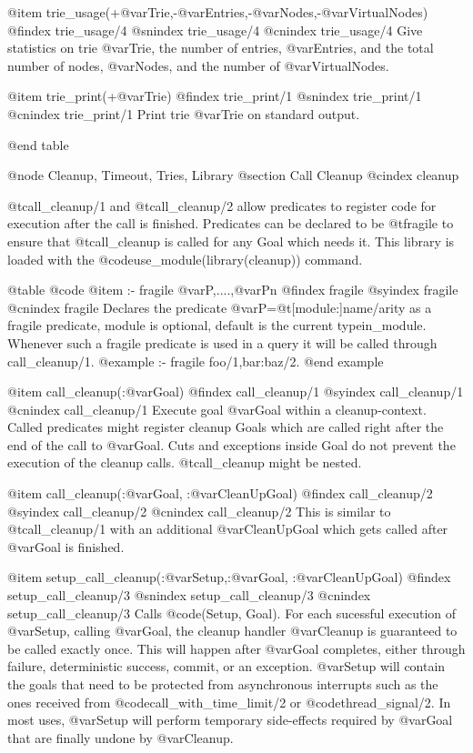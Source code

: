 {{{{{{{{{@item trie_usage(+@var{Trie},-@var{Entries},-@var{Nodes},-@var{VirtualNodes})
@findex trie_usage/4
@snindex trie_usage/4
@cnindex trie_usage/4
Give statistics on trie @var{Trie}, the number of entries,
@var{Entries}, and the total number of nodes, @var{Nodes}, and the
number of @var{VirtualNodes}.

@item trie_print(+@var{Trie})
@findex trie_print/1
@snindex trie_print/1
@cnindex trie_print/1
Print trie @var{Trie} on standard output.




@end table


@node Cleanup, Timeout, Tries, Library
@section Call Cleanup
@cindex cleanup

@t{call_cleanup/1} and @t{call_cleanup/2} allow predicates to register
code for execution after the call is finished. Predicates can be
declared to be @t{fragile} to ensure that @t{call_cleanup} is called
for any Goal which needs it. This library is loaded with the
@code{use_module(library(cleanup))} command.

@table @code
@item :- fragile @var{P},....,@var{Pn}
@findex fragile
@syindex fragile
@cnindex fragile
Declares the predicate @var{P}=@t{[module:]name/arity} as a fragile
predicate, module is optional, default is the current
typein_module. Whenever such a fragile predicate is used in a query
it will be called through call_cleanup/1.
@example
:- fragile foo/1,bar:baz/2.
@end example

@item call_cleanup(:@var{Goal})
@findex call_cleanup/1
@syindex call_cleanup/1
@cnindex call_cleanup/1
Execute goal @var{Goal} within a cleanup-context. Called predicates
might register cleanup Goals which are called right after the end of
the call to @var{Goal}. Cuts and exceptions inside Goal do not prevent the
execution of the cleanup calls. @t{call_cleanup} might be nested.

@item call_cleanup(:@var{Goal}, :@var{CleanUpGoal})
@findex call_cleanup/2
@syindex call_cleanup/2
@cnindex call_cleanup/2
This is similar to @t{call_cleanup/1} with an additional
@var{CleanUpGoal} which gets called after @var{Goal} is finished.

@item setup_call_cleanup(:@var{Setup},:@var{Goal}, :@var{CleanUpGoal})
@findex setup_call_cleanup/3
@snindex setup_call_cleanup/3
@cnindex setup_call_cleanup/3
Calls @code{(Setup, Goal)}. For each sucessful execution of @var{Setup}, calling @var{Goal}, the
cleanup handler @var{Cleanup} is guaranteed to be called exactly once.
This will happen after @var{Goal} completes, either through failure,
deterministic success, commit, or an exception.  @var{Setup} will
contain the goals that need to be protected from asynchronous interrupts
such as the ones received from @code{call_with_time_limit/2} or @code{thread_signal/2}.  In
most uses, @var{Setup} will perform temporary side-effects required by
@var{Goal} that are finally undone by @var{Cleanup}.

}}}}}}}}}
